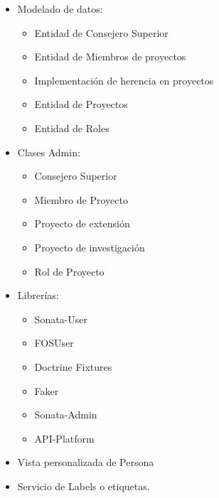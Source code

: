 \begin{itemize}
    \item Modelado de datos:
    \begin{itemize}
        \item Entidad de Consejero Superior
        \item Entidad de Miembros de proyectos
        \item Implementación de herencia en proyectos
        \item Entidad de Proyectos
        \item Entidad de Roles
    \end{itemize}
    \item Clases Admin:
    \begin{itemize}
        \item Consejero Superior
        \item Miembro de Proyecto
        \item Proyecto de extensión
        \item Proyecto de investigación
        \item Rol de Proyecto
    \end{itemize}
    \item Librerías:
    \begin{itemize}
        \item Sonata-User
        \item FOSUser
        \item Doctrine Fixtures
        \item Faker
        \item Sonata-Admin
        \item API-Platform
    \end{itemize}
    \item Vista personalizada de Persona
    \item Servicio de Labels o etiquetas.
\end{itemize}
